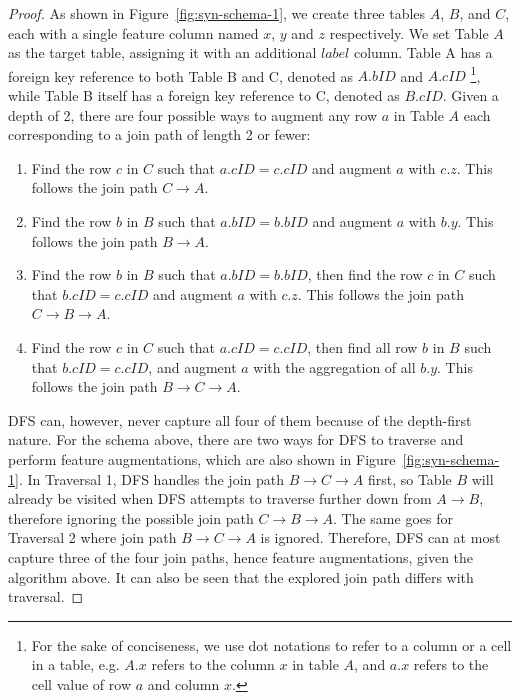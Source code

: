 \begin{proof}
    \header
    As shown in Figure~\ref{fig:syn-schema-1}, we create three tables $A$, $B$, and $C$, each with a single feature column named $x$, $y$ and $z$ respectively.  We set Table $A$ as the target table, assigning it with an additional $label$ column.
    Table A has a foreign key reference to both Table B and C, denoted as $A.bID$ and $A.cID$ \footnote{For the sake of conciseness, we use dot notations to refer to a column or a cell in a table, e.g. $A.x$ refers to the column $x$ in table $A$, and $a.x$ refers to the cell value of row $a$ and column $x$.}, while Table B itself has a foreign key reference to C, denoted as $B.cID$.  Given a depth of 2, there are four possible ways to augment any row $a$ in Table $A$ each corresponding to a join path of length 2 or fewer:
    \begin{enumerate}[leftmargin=*]
        \item Find the row $c$ in $C$ such that $a.cID = c.cID$ and augment $a$ with $c.z$.  This follows the join path $C \rightarrow A$.
        \item Find the row $b$ in $B$ such that $a.bID = b.bID$ and augment $a$ with $b.y$.  This follows the join path $B \rightarrow A$.
        \item Find the row $b$ in $B$ such that $a.bID = b.bID$, then find the row $c$ in $C$ such that $b.cID = c.cID$ and augment $a$ with $c.z$.  This follows the join path $C \rightarrow B \rightarrow A$.
        \item Find the row $c$ in $C$ such that $a.cID = c.cID$, then find all row $b$ in $B$ such that $b.cID = c.cID$, and augment $a$ with the aggregation of all $b.y$.  This follows the join path $B \rightarrow C \rightarrow A$.
    \end{enumerate}
    DFS can, however,  never capture all four of them because of the depth-first nature.  For the schema above, there are two ways for DFS to traverse and perform feature augmentations, which are also shown in Figure~\ref{fig:syn-schema-1}.  In Traversal 1, DFS handles the join path $B \rightarrow C \rightarrow A$ first, so Table $B$ will already be visited when DFS attempts to traverse further down from $A \rightarrow B$, therefore ignoring the possible join path $C \rightarrow B \rightarrow A$.  The same goes for Traversal 2 where join path $B \rightarrow C \rightarrow A$ is ignored.  Therefore, DFS can at most capture three of the four join paths, hence feature augmentations, given the algorithm above.  It can also be seen that the explored join path differs with traversal.
\end{proof}


